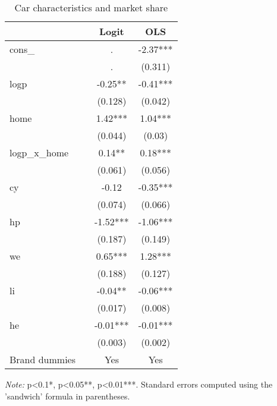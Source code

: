 \documentclass[11pt]{article}
\begin{document}
\begin{table}[H]
    \centering
    \caption{Car characteristics and market share}
    \label{tab:Logit_OLS_A}
    \begin{threeparttable}
        \begin{tabular}{llcc}
        \toprule
           & {} &     Logit &       OLS \\
        \midrule
        cons\_ & {} &         . &  -2.37*** \\
           & {} &         . &   (0.311) \\
        logp & {} &   -0.25** &  -0.41*** \\
           & {} &   (0.128) &   (0.042) \\
        home & {} &   1.42*** &   1.04*** \\
           & {} &   (0.044) &    (0.03) \\
        logp\_x\_home & {} &    0.14** &   0.18*** \\
           & {} &   (0.061) &   (0.056) \\
        cy & {} &     -0.12 &  -0.35*** \\
           & {} &   (0.074) &   (0.066) \\
        hp & {} &  -1.52*** &  -1.06*** \\
           & {} &   (0.187) &   (0.149) \\
        we & {} &   0.65*** &   1.28*** \\
           & {} &   (0.188) &   (0.127) \\
        li & {} &   -0.04** &  -0.06*** \\
           & {} &   (0.017) &   (0.008) \\
        he & {} &  -0.01*** &  -0.01*** \\
           & {} &   (0.003) &   (0.002) \\
        \midrule
        Brand dummies & & Yes & Yes \\
        \bottomrule
        \end{tabular}
                \begin{tablenotes}
                    \footnotesize \textit{Note:} p<0.1*, p<0.05**, p<0.01***. Standard errors computed using the 'sandwich' formula in parentheses. 
                \end{tablenotes}
                
    \end{threeparttable}
\end{table}
\end{document}
